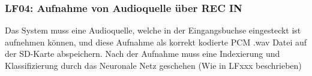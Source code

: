 \subsubsection{LF04: Aufnahme von Audioquelle über REC IN}
Das System muss eine Audioquelle, welche in der Eingangsbuchse eingesteckt ist aufnehmen können, und diese Aufnahme als korrekt kodierte PCM .wav Datei auf der SD-Karte abspeichern. Nach der Aufnahme muss eine Indexierung und Klassifizierung durch das Neuronale Netz geschehen (Wie in LFxxx beschrieben)
